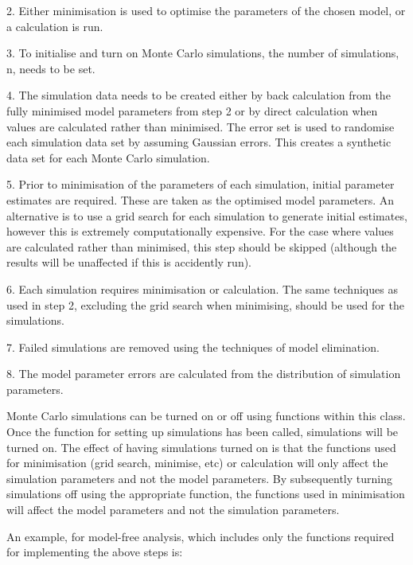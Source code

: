 2.  Either minimisation is used to optimise the parameters of the chosen model, or a
calculation is run.

3.  To initialise and turn on Monte Carlo simulations, the number of simulations, n, needs
to be set.

4.  The simulation data needs to be created either by back calculation from the fully
minimised model parameters from step 2 or by direct calculation when values are calculated
rather than minimised.  The error set is used to randomise each simulation data set by
assuming Gaussian errors.  This creates a synthetic data set for each Monte Carlo
simulation.

5.  Prior to minimisation of the parameters of each simulation, initial parameter estimates
are required.  These are taken as the optimised model parameters.  An alternative is to use
a grid search for each simulation to generate initial estimates, however this is extremely
computationally expensive.  For the case where values are calculated rather than minimised,
this step should be skipped (although the results will be unaffected if this is accidently
run).

6.  Each simulation requires minimisation or calculation.  The same techniques as used in
step 2, excluding the grid search when minimising, should be used for the simulations.

7.  Failed simulations are removed using the techniques of model elimination.

8.  The model parameter errors are calculated from the distribution of simulation
parameters.


Monte Carlo simulations can be turned on or off using functions within this class.  Once the
function for setting up simulations has been called, simulations will be turned on.  The
effect of having simulations turned on is that the functions used for minimisation (grid
search, minimise, etc) or calculation will only affect the simulation parameters and not the
model parameters.  By subsequently turning simulations off using the appropriate function,
the functions used in minimisation will affect the model parameters and not the simulation
parameters.


An example, for model-free analysis, which includes only the functions required for
implementing the above steps is:



